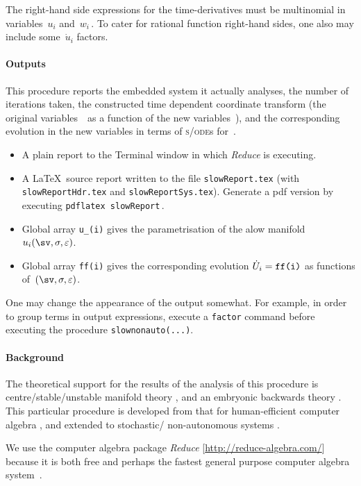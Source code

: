 \documentclass[11pt,a5paper]{article}
\def\eps{\ensuremath{\varepsilon}}
\def\sde{\textsc{s/ode}}
\begin{document}
The right-hand side expressions for the time-derivatives
must be multinomial in variables~$u_i$ and~$w_i$\,.  To
cater for rational function right-hand sides, one also may
include some~\(\dot u_i\) factors.


\paragraph{Outputs}  This procedure reports the embedded
system it actually analyses, the number of iterations taken,
the constructed time dependent coordinate transform (the
original variables~\uv\ as a function of the new
variables~\sv), and the corresponding evolution in the new
variables in terms of \sde{}s for~\sv.
\begin{itemize}
\item A plain report to the Terminal window in which
\emph{Reduce} is executing.

\item A \LaTeX\ source report written to the file
\verb|slowReport.tex| (with \verb|slowReportHdr.tex|
and \verb|slowReportSys.tex|). Generate a pdf version 
by executing \verb|pdflatex slowReport|\,.

\item Global array \verb|u_(i)| gives the parametrisation of
the alow manifold~\(u_i(\sv,\sigma,\eps)\).

\item Global array \verb|ff(i)| gives the corresponding
evolution \(\dot U_i=\verb|ff(i)|\)  as functions
of~\((\sv,\sigma,\eps)\).
\end{itemize}
One may change the appearance of the output somewhat. For
example, in order to group terms in output expressions,
execute a \verb|factor| command before executing the
procedure \verb|slownonauto(...)|.


\paragraph{Background}
The theoretical support for the results of the analysis of
this procedure is centre\slash stable\slash unstable
manifold theory \cite[e.g.,][]{Carr81, Knobloch82,
Haragus2011, Roberts2014a}, and an embryonic backwards
theory \cite[]{Roberts2018a}.  This particular procedure is
developed from that for human-efficient computer algebra
\cite[]{Roberts96a}, and extended to stochastic\slash
non-autonomous systems \cite[]{Chao95, Roberts06k}.

We use the computer algebra package \emph{Reduce} 
[\url{http://reduce-algebra.com/}] because it is both free 
and perhaps the fastest general purpose computer algebra 
system~\cite[e.g.]{Fateman2002}.
\end{document}
